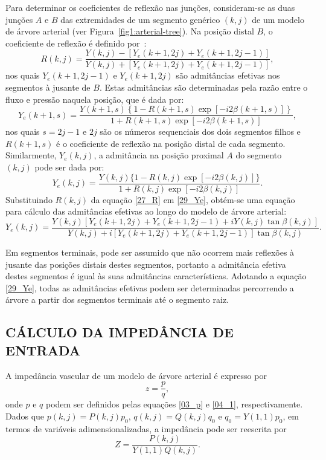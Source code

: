 \documentclass[a4paper,12pt]{monografia}
\theoremstyle{plain}
\theoremstyle{definition}
\theoremstyle{remark}
\begin{document}
Para determinar os coeficientes de reflexão nas junções, consideram-se as duas junções $A$ e $B$ das extremidades de um segmento genérico $(k,j)$ de um modelo de árvore arterial (ver Figura~\ref{fig1:arterial-tree}). Na posição distal $B$, o coeficiente de reflexão é definido por~\cite{Fung,Lighthill}:
\begin{equation}
	R(k,j) = \frac{Y(k,j) - [Y_e(k+1,2j) + Y_e(k+1,2j-1)]}{Y(k,j) + [Y_e(k+1,2j) + Y_e(k+1,2j-1)]},
	\label{27_R}
\end{equation}
nos quais $Y_e(k+1,2j-1)$ e $Y_e(k+1,2j)$ são admitâncias efetivas nos segmentos à jusante de $B$. Estas admitâncias são determinadas pela razão entre o fluxo e pressão naquela posição, que é dada por:
\begin{equation}
	Y_e(k+1,s) = \frac{Y(k+1,s)\left\{1 - R(k+1,s)\exp{[-i2\beta(k+1,s)]}\right\}}{1 + R(k+1,s)\exp{[-i2\beta(k+1,s)]}},
	\label{28_Ye}
\end{equation}
nos quais $s = 2j-1$ e $2j$ são os números sequenciais dos dois segmentos filhos e $R(k+1,s)$ é o coeficiente de reflexão na posição distal de cada segmento. Similarmente, $Y_e(k,j)$, a admitância na posição proximal $A$ do segmento $(k,j)$ pode ser dada por:
\begin{equation}
	Y_e(k,j) = \frac{Y(k,j)\{1 - R(k,j)\exp{[-i2\beta(k,j)]}\} }{1 + R(k,j)\exp{[-i2\beta(k,j)]}}
	\label{29_Ye}.
\end{equation}
Substituindo $R(k,j)$ da equação \eqref{27_R} em \eqref{29_Ye}, obtém-se  uma equação para cálculo das admitâncias efetivas ao longo do modelo de árvore arterial:
\begin{equation}
	Y_e(k,j) = \frac{Y(k,j) [Y_e(k+1,2j) + Y_e(k+1,2j-1)+ i Y(k,j)\tan{\beta(k,j)}]}{Y(k,j) + i[Y_e(k+1,2j) + Y_e(k+1,2j-1)]\tan{\beta(k,j)}}.
	\label{30_Ye}
\end{equation}

Em segmentos terminais, pode ser assumido que não ocorrem mais reflexões à jusante das posições distais destes segmentos, portanto a admitância efetiva destes segmentos é igual às suas admitâncias características. Adotando a equação \eqref{29_Ye}, todas as admitâncias efetivas podem ser determinadas percorrendo a árvore a partir dos segmentos terminais até o segmento raiz.

\subsection{CÁLCULO DA IMPEDÂNCIA DE ENTRADA}

A impedância vascular de um modelo de árvore arterial é expresso por
\begin{equation}
	z = \frac{p}{q},
\end{equation}
onde $p$ e $q$ podem ser definidos pelas equações \eqref{03_p} e \eqref{04_1}, respectivamente. Dados que $p(k,j) = P(k,j) p_0$, $q(k,j) = Q(k,j) q_0$ e $q_0 = Y(1,1) p_0$, em termos de variáveis adimensionalizadas, a impedância pode ser reescrita por
\begin{equation}
	Z = \frac{P(k,j)}{Y(1,1) Q(k,j)}.
\end{equation}
\end{document}
